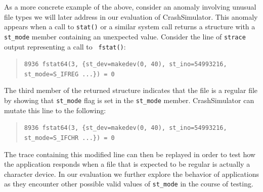 
As a more concrete example of the above, consider an anomaly
involving unusual file types we will later address in our evaluation of
CrashSimulator.  This anomaly appears when a call to {\tt stat()} or a similar system
call returns a structure with a {\tt st\_mode} member containing an unexpected
value. Consider the line of {\tt strace} output representing a call to {\tt
  fstat()}:
\begin{quote}
  {\tt 8936  fstat64(3, \{st\_dev=makedev(0, 40), st\_ino=54993216, st\_mode=S\_IFREG ...\}) = 0}
\end{quote}
The third member of the returned structure indicates that the file is a
regular file by showing that {\tt st\_mode} flag is set in the {\tt st\_mode}
member.  CrashSimulator can mutate this  line to the following:

\begin{quote}
  {\tt 8936  fstat64(3, \{st\_dev=makedev(0, 40), st\_ino=54993216, st\_mode=S\_IFCHR ...\}) = 0}
\end{quote}

The trace containing this modified line can then be replayed in order to
test how the application responds when a file that is expected to be
regular is actually a character device. In our evaluation we further
explore the behavior of applications as they encounter other possible valid
values of {\tt st\_mode} in the course of testing.


